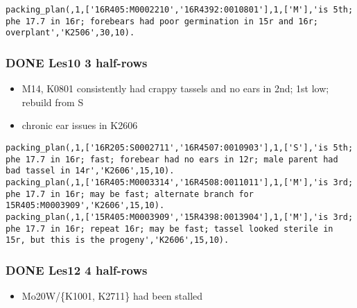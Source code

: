 \documentclass[11pt]{article}
\begin{document}
\begin{verbatim}
packing_plan(,1,['16R405:M0002210','16R4392:0010801'],1,['M'],'is 5th; phe 17.7 in 16r; forebears had poor germination in 15r and 16r; overplant','K2506',30,10).
\end{verbatim}



\subsubsection{{\bfseries\sffamily DONE} Les10 3 half-rows}
\label{sec-4-5-6}


\begin{itemize}
\item M14, K0801 consistently had crappy tassels and no ears in 2nd; 1st low; rebuild from S

\item chronic ear issues in K2606
\end{itemize}


\begin{verbatim}
packing_plan(,1,['16R205:S0002711','16R4507:0010903'],1,['S'],'is 5th; phe 17.7 in 16r; fast; forebear had no ears in 12r; male parent had bad tassel in 14r','K2606',15,10).
packing_plan(,1,['16R405:M0003314','16R4508:0011011'],1,['M'],'is 3rd; phe 17.7 in 16r; may be fast; alternate branch for 15R405:M0003909','K2606',15,10).
packing_plan(,1,['15R405:M0003909','15R4398:0013904'],1,['M'],'is 3rd; phe 17.7 in 16r; repeat 16r; may be fast; tassel looked sterile in 15r, but this is the progeny','K2606',15,10).
\end{verbatim}



\subsubsection{{\bfseries\sffamily DONE} Les12 4 half-rows}
\label{sec-4-5-7}

\begin{itemize}
\item Mo20W/\{K1001, K2711\} had been stalled
\end{itemize}
\end{document}
